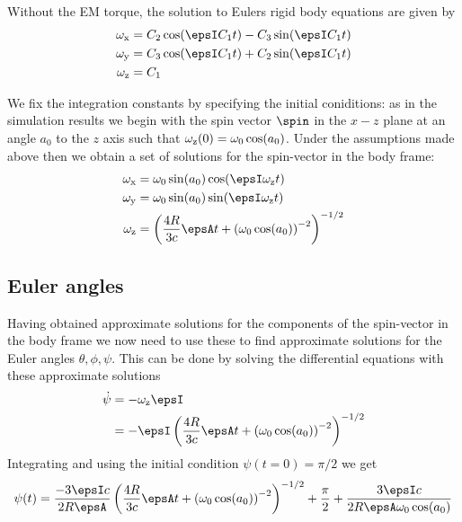 \documentclass[/home/greg/Thesis/main/main.tex]{subfiles}
\begin{document}
Without the EM torque, the solution to Eulers rigid body equations are given by
\begin{align}
\wx &= C_2 \cos(\epsI C_1 t) - C_3 \sin(\epsI C_1 t) \\
\wy &= C_3 \cos(\epsI C_1 t) + C_2 \sin(\epsI C_1 t) \\
\wz &= C_1 
\end{align}

We fix the integration constants by specifying the initial coniditions: as in
the simulation results we begin with the spin vector $\spin$ in the $x-z$ plane
at an angle $a_{0}$ to the $z$ axis such that $\omega_{\mathrm{z}}(0) = \omega_{0}\cos(a_{0})$.
Under the assumptions made above then we obtain a set of solutions for the
spin-vector in the body frame:
\begin{align}
\wx &= \omega_0 \sin(a_0) \cos(\epsI \wz t)  \\
\wy &= \omega_0 \sin(a_0) \sin(\epsI \wz t) \\
\wz &= \left(\frac{4R}{3c} \epsA t + \left(\omega_0 \cos(a_0)\right)^{-2}\right)^{-1/2}
\end{align}

\subsection{Euler angles}
Having obtained approximate solutions for the components of the spin-vector in
the body frame we now need to use these to find approximate solutions for the
Euler angles $\theta, \phi, \psi$. This can be done by solving the differential
equations with these approximate solutions
\begin{align}
    \dot{\psi} &= -\wz \epsI \\
    &= -\epsI\left(\frac{4R}{3c} \epsA t + \left(\omega_0 \cos(a_0)\right)^{-2}\right)^{-1/2}
\end{align}
Integrating and using the initial condition $\psi(t=0) = \pi/2$ we get
\begin{align}
\psi(t) = \frac{-3\epsI c}{2 R \epsA} 
          \left(\frac{4R}{3c} \epsA t + \left(\omega_0 \cos(a_0)\right)^{-2}\right)^{-1/2}
          + \frac{\pi}{2} + \frac{3 \epsI c}{2 R \epsA \omega_0 \cos(a_0)}
\end{align}

\biblio
\end{document}
